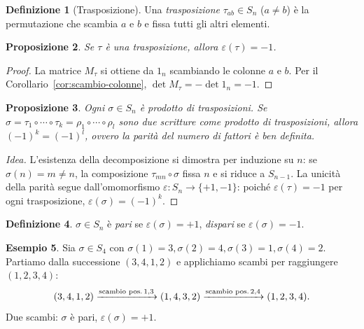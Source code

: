 \documentclass[11pt, a4paper]{book}
\theoremstyle{definition}
\newtheorem{definizione}{Definizione}[section]
\newtheorem{esempio}[definizione]{Esempio}
\theoremstyle{plain}
\newtheorem{proposizione}[definizione]{Proposizione}
\theoremstyle{remark}
\begin{document}
\begin{defbox}
\begin{definizione}[Trasposizione]
Una \emph{trasposizione} $\tau_{ab} \in S_n$ ($a \neq b$) è la permutazione che scambia $a$ e $b$ e fissa tutti gli altri elementi.
\end{definizione}
\end{defbox}

\begin{proposizione}
\label{prop:segno-trasposizione}
Se $\tau$ è una trasposizione, allora $\varepsilon(\tau) = -1$.
\end{proposizione}

\begin{proof}
La matrice $M_\tau$ si ottiene da $1_n$ scambiando le colonne $a$ e $b$. Per il Corollario~\ref{cor:scambio-colonne}, $\det M_\tau = -\det 1_n = -1$.
\end{proof}

\begin{proposizione}
\label{prop:sn-trasposizioni}
Ogni $\sigma \in S_n$ è prodotto di trasposizioni. Se $\sigma = \tau_1\circ\cdots\circ\tau_k = \rho_1\circ\cdots\circ\rho_l$ sono due scritture come prodotto di trasposizioni, allora $(-1)^k = (-1)^l$, ovvero la parità del numero di fattori è ben definita.
\end{proposizione}

\begin{proof}[Idea]
L'esistenza della decomposizione si dimostra per induzione su $n$: se $\sigma(n)=m\neq n$, la composizione $\tau_{mn}\circ\sigma$ fissa $n$ e si riduce a $S_{n-1}$. La unicità della parità segue dall'omomorfismo $\varepsilon \colon S_n \to \{+1,-1\}$: poiché $\varepsilon(\tau)=-1$ per ogni trasposizione, $\varepsilon(\sigma) = (-1)^k$.
\end{proof}

\begin{defbox}
\begin{definizione}
$\sigma \in S_n$ è \emph{pari} se $\varepsilon(\sigma)=+1$, \emph{dispari} se $\varepsilon(\sigma)=-1$.
\end{definizione}
\end{defbox}

\begin{exbox}
\begin{esempio}
Sia $\sigma \in S_4$ con $\sigma(1)=3,\sigma(2)=4,\sigma(3)=1,\sigma(4)=2$. Partiamo dalla successione $(3,4,1,2)$ e applichiamo scambi per raggiungere $(1,2,3,4)$:
\[
  (3,4,1,2) \xrightarrow{\text{scambio pos.\,1,3}} (1,4,3,2) \xrightarrow{\text{scambio pos.\,2,4}} (1,2,3,4).
\]
Due scambi: $\sigma$ è pari, $\varepsilon(\sigma) = +1$.
\end{esempio}
\end{exbox}
\end{document}
